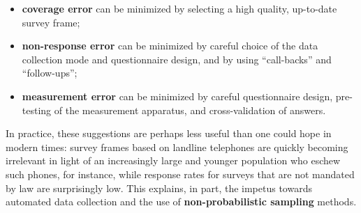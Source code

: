 \begin{itemize}[noitemsep]
\item \textbf{coverage error} can be minimized by selecting a high quality, up-to-date survey frame;
\item \textbf{non-response error} can be minimized by careful choice of the data collection mode and questionnaire design, and by using ``call-backs'' and ``follow-ups'';
\item \textbf{measurement error} can be minimized by careful questionnaire design, pre-testing of the measurement apparatus, and cross-validation of answers.  
\end{itemize}
In practice, these suggestions are perhaps less useful than one could hope in modern times: survey frames based on landline telephones are quickly becoming irrelevant in light of an increasingly large and younger population who eschew such phones, for instance, while response rates for surveys that are not mandated by law are  surprisingly low. This explains, in part, the impetus towards automated data collection and the use of \textbf{non-probabilistic sampling} methods.     
